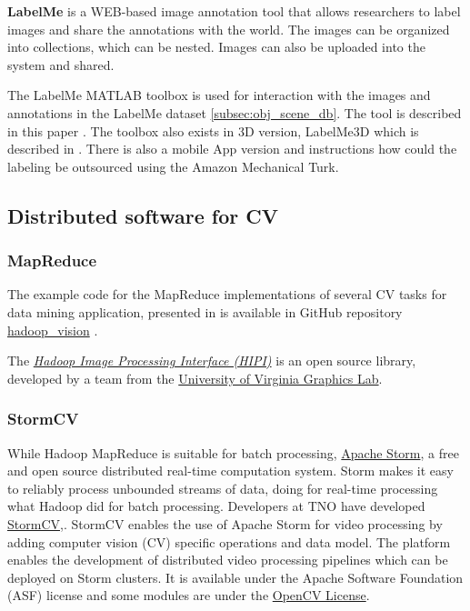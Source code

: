 {{\bf LabelMe} is a WEB-based image annotation tool that allows researchers to label images and share the annotations with the world. The images can be organized into collections, which can be nested. Images can also be uploaded into the system and shared.

The LabelMe MATLAB toolbox is used for interaction with the images and annotations in the LabelMe dataset \ref{subsec:obj_scene_db}. The tool is described in this paper
\cite{Russell2008}. The toolbox also exists in 3D version, LabelMe3D which is described in \cite{Russell2009}. There is also a mobile App version and instructions how could the labeling be outsourced using the Amazon Mechanical Turk.

\subsection{Distributed software for CV}

\subsubsection{MapReduce}\label{subsubsec:MapReduce}
The example code for the MapReduce implementations of several CV tasks for data mining application, presented in \cite{White:2010} is available in  GitHub repository \href{https://github.com/bwhite/hadoop_vision}{hadoop\_vision} \cite{hadoopvision_soft}.

The \href{http://hipi.cs.virginia.edu}{\em Hadoop Image Processing Interface (HIPI)} \cite{hipi_soft} is an open source library, developed by a team from the \href{http://www.cs.virginia.edu/~gfx/pmwiki/index.php}{University of Virginia Graphics Lab}.
\subsubsection{StormCV}
While Hadoop MapReduce is suitable for batch processing, \href{https://storm.apache.org/}{Apache Storm},\cite{storm_soft} a free and open source distributed real-time computation system. Storm makes it easy to reliably process unbounded streams of data, doing for real-time processing what Hadoop did for batch processing.
Developers at TNO have developed  \href{https://github.com/sensorstorm/StormCV}{StormCV},\cite{stormcv_soft}. StormCV enables the use of Apache Storm for video processing by adding computer vision (CV) specific operations and data model. The platform enables the development of distributed video processing pipelines which can be deployed on Storm clusters. It is available under the  Apache Software Foundation (ASF) license and some modules are under the \href{http://opencv.org/license.html}{OpenCV License}.
}
